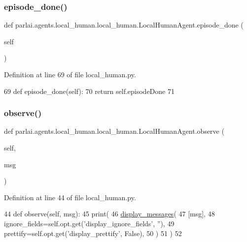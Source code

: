 \subsubsection{\texorpdfstring{episode\+\_\+done()}{episode\_done()}}
{\footnotesize\ttfamily def parlai.\+agents.\+local\+\_\+human.\+local\+\_\+human.\+Local\+Human\+Agent.\+episode\+\_\+done (\begin{DoxyParamCaption}\item[{}]{self }\end{DoxyParamCaption})}



Definition at line 69 of file local\+\_\+human.\+py.


\begin{DoxyCode}
69     \textcolor{keyword}{def }episode\_done(self):
70         \textcolor{keywordflow}{return} self.episodeDone
71 \end{DoxyCode}
\mbox{\label{classparlai_1_1agents_1_1local__human_1_1local__human_1_1LocalHumanAgent_aa204d28672d6580895d95aed167cb129}} 
\subsubsection{\texorpdfstring{observe()}{observe()}}
{\footnotesize\ttfamily def parlai.\+agents.\+local\+\_\+human.\+local\+\_\+human.\+Local\+Human\+Agent.\+observe (\begin{DoxyParamCaption}\item[{}]{self,  }\item[{}]{msg }\end{DoxyParamCaption})}



Definition at line 44 of file local\+\_\+human.\+py.


\begin{DoxyCode}
44     \textcolor{keyword}{def }observe(self, msg):
45         print(
46             \hyperlink{namespaceparlai_1_1utils_1_1misc_a146f303a4c4b34993458968c74b55d2f}{display\_messages}(
47                 [msg],
48                 ignore\_fields=self.opt.get(\textcolor{stringliteral}{'display\_ignore\_fields'}, \textcolor{stringliteral}{''}),
49                 prettify=self.opt.get(\textcolor{stringliteral}{'display\_prettify'}, \textcolor{keyword}{False}),
50             )
51         )
52 
\end{DoxyCode}



